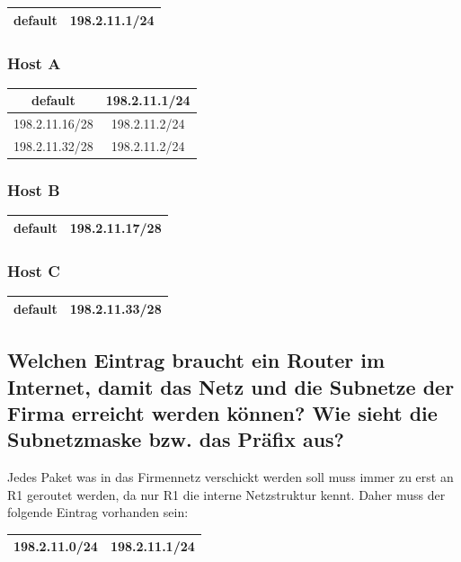 \documentclass{article}
\begin{document}
\begin{tabular}{|c|c|}
	\hline
	default        & 198.2.11.1/24 \\
	\hline
\end{tabular}

\subsubsection*{Host A}

\begin{tabular}{|c|c|}
	\hline
	default        & 198.2.11.1/24 \\
	\hline
	198.2.11.16/28 & 198.2.11.2/24 \\
	\hline
	198.2.11.32/28 & 198.2.11.2/24 \\
	\hline
\end{tabular}

\subsubsection*{Host B}

\begin{tabular}{|c|c|}
	\hline
	default & 198.2.11.17/28 \\
	\hline
\end{tabular}

\subsubsection*{Host C}

\begin{tabular}{|c|c|}
	\hline
	default & 198.2.11.33/28 \\
	\hline
\end{tabular}

\subsection{Welchen Eintrag braucht ein Router im Internet, damit das Netz und die Subnetze der Firma erreicht
werden können? Wie sieht die Subnetzmaske bzw. das Präfix aus?}

Jedes Paket was in das Firmennetz verschickt werden soll muss immer zu erst an R1 geroutet werden, da nur R1 die
interne Netzstruktur kennt. Daher muss der folgende Eintrag vorhanden sein:

\vspace{1em}

\begin{tabular}{|c|c|}
	\hline
	198.2.11.0/24 & 198.2.11.1/24 \\
	\hline
\end{tabular}
\end{document}

